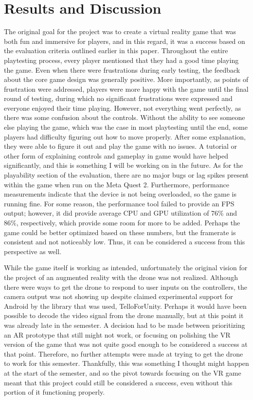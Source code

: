 \documentclass[10pt,twocolumn]{article}
\begin{document}
\section{Results and Discussion}
The original goal for the project was to create a virtual reality game that was both fun and immersive for players, and in this regard, it was a success based on the evaluation criteria outlined earlier in this paper. Throughout the entire playtesting process, every player mentioned that they had a good time playing the game. Even when there were frustrations during early testing, the feedback about the core game design was generally positive. More importantly, as points of frustration were addressed, players were more happy with the game until the final round of testing, during which no significant frustrations were expressed and everyone enjoyed their time playing. However, not everything went perfectly, as there was some confusion about the controls. Without the ability to see someone else playing the game, which was the case in most playtesting until the end, some players had difficulty figuring out how to move properly. After some explanation, they were able to figure it out and play the game with no issues. A tutorial or other form of explaining controls and gameplay in game would have helped significantly, and this is something I will be working on in the future. As for the playability section of the evaluation, there are no major bugs or lag spikes present within the game when run on the Meta Quest 2. Furthermore, performance measurements indicate that the device is not being overloaded, so the game is running fine. For some reason, the performance tool failed to provide an FPS output; however, it did provide average CPU and GPU utilization of 76\% and 86\%, respectively, which provide some room for more to be added. Perhaps the game could be better optimized based on these numbers, but the framerate is consistent and not noticeably low. Thus, it can be considered a success from this perspective as well.

While the game itself is working as intended, unfortunately the original vision for the project of an augmented reality with the drone was not realized. Although there were ways to get the drone to respond to user inputs on the controllers, the camera output was not showing up despite claimed experimental support for Android by the library that was used, TelloForUnity\cite{TelloUnity}. Perhaps it would have been possible to decode the video signal from the drone manually, but at this point it was already late in the semester. A decision had to be made between prioritizing an AR prototype that still might not work, or focusing on polishing the VR version of the game that was not quite good enough to be considered a success at that point. Therefore, no further attempts were made at trying to get the drone to work for this semester. Thankfully, this was something I thought might happen at the start of the semester, and so the pivot towards focusing on the VR game meant that this project could still be considered a success, even without this portion of it functioning properly.
\end{document}
